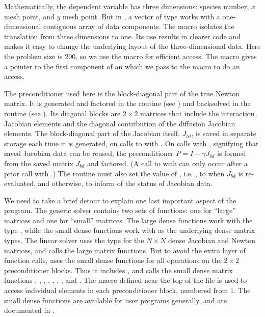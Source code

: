 Mathematically, the dependent variable has three dimensions: species
number, $x$ mesh point, and $y$ mesh point.  But in {\nvecs}, a vector of
type  works with a one-dimensional contiguous array of
data components. The macro  isolates the translation from
three dimensions to one. Its use results in clearer code and makes it
easy to change the underlying layout of the three-dimensional data. 
Here the problem size is $200$, so we use the  macro
for efficient  access.  The  macro gives
a pointer to the first component of an  which we pass to
the  macro to do an  access.

The preconditioner used here is the block-diagonal part of the true Newton
matrix.  It is generated and factored in the  routine 
(see ) and backsolved in the  routine 
(see ). Its diagonal blocks are $2 \times 2$
matrices that include the interaction Jacobian elements and the diagonal
contribution of the diffusion Jacobian elements.  The block-diagonal part of
the Jacobian itself, $J_{bd}$, is saved in separate storage each time it is
generated, on calls to  with .
On calls with , signifying that saved Jacobian data
can be reused, the preconditioner $P = I - \gamma J_{bd}$ is formed from the
saved matrix $J_{bd}$ and factored.  (A call to  with
 can only occur after a prior call with
.)  The  routine must also set the value
of , i.e. , to  when $J_{bd}$ is re-evaluated,
and  otherwise, to inform {\cvspgmr} of the status of Jacobian data.

We need to take a brief detour to explain one last important aspect of
the  program.  The generic {\dense} solver contains two
sets of functions: one for ``large'' matrices and one for ``small''
matrices.  The large dense functions work with the type ,
while the small dense functions work with  as the
underlying dense matrix types.  The {\cvdense} linear solver uses the
type  for the $N \times N$ dense Jacobian and Newton
matrices, and calls the large matrix functions.  But to avoid the
extra layer of function calls,  uses the small dense
functions for all operations on the $2 \times 2$ preconditioner blocks.  
Thus it includes , and calls the small dense matrix
functions , , , , 
, , , and .  The macro
 defined near the top of the file is used to access
individual elements in each preconditioner block, numbered from $1$.
The small dense functions are available for {\cvode} user programs
generally, and are documented in .

